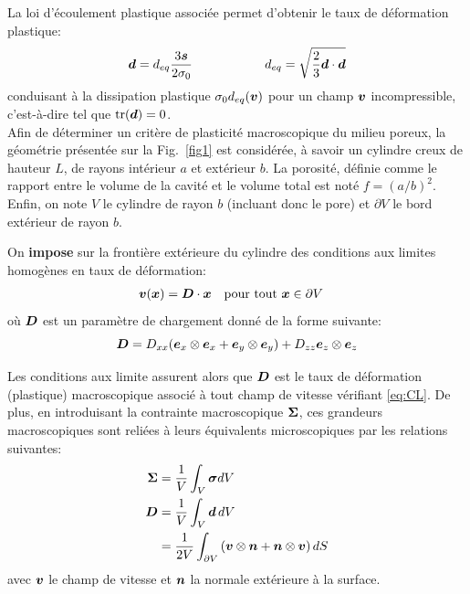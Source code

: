 \documentclass[french,12pt]{exam}
\begin{document}
La loi d'écoulement plastique associée permet d'obtenir le taux de déformation plastique:
\begin{equation}
  \boldsymbol{d} = d_{eq} \frac{3 \boldsymbol{s}}{2 \sigma_0}  \hspace{2cm} d_{eq} = \sqrt{\frac{2}{3}\boldsymbol{d} \cdot \boldsymbol{d} }
  \label{eq200}
\end{equation}
conduisant à la dissipation plastique $\sigma_0d_{eq}(\boldsymbol{v})$ pour un champ $\boldsymbol{v}$ incompressible, c'est-à-dire tel que $\mathrm{tr}(\boldsymbol{d})=0$.\\

Afin de déterminer un critère de plasticité macroscopique du milieu poreux, la géométrie présentée sur la Fig.~\ref{fig1} est considérée, à savoir un cylindre creux de hauteur $L$, de rayons intérieur $a$ et extérieur $b$. La porosité, définie comme le rapport entre le volume de la cavité et le volume total est noté $f = (a/b)^2$. Enfin, on note $V$ le cylindre de rayon $b$ (incluant donc le pore) et $\partial V$ le bord extérieur de rayon $b$.

On \textbf{impose} sur la frontière extérieure du cylindre des conditions aux limites homogènes en taux de déformation:
\begin{align}
\boldsymbol{v}(\boldsymbol{x}) &= \boldsymbol{D}\cdot\boldsymbol{x} \quad \text{pour tout }\boldsymbol{x}\in \partial V \label{eq:CL}
\end{align}
où $\boldsymbol{D}$ est un paramètre de chargement donné de la forme suivante:
\begin{equation}
\boldsymbol{D} = D_{xx} (\boldsymbol{e}_x \otimes \boldsymbol{e}_x + \boldsymbol{e}_y \otimes \boldsymbol{e}_y) + D_{zz} \boldsymbol{e}_z \otimes \boldsymbol{e}_z \label{eq:D-GPS}
\end{equation}

Les conditions aux limite assurent alors que $\boldsymbol{D}$ est le taux de déformation (plastique) macroscopique associé à tout champ de vitesse vérifiant \eqref{eq:CL}. De plus, en introduisant la contrainte macroscopique $\boldsymbol{\Sigma}$, ces grandeurs macroscopiques sont reliées à leurs équivalents microscopiques par les relations suivantes:
\begin{align}
  \boldsymbol{\Sigma} &= \frac{1}{V} \int_V \boldsymbol{\sigma} dV\\
  \boldsymbol{D} &= \frac{1}{V} \int_V \boldsymbol{d} \, dV \\
  &= \frac{1}{2V} \int_{\partial V} \left(\boldsymbol{v} \otimes \boldsymbol{n} + \boldsymbol{n} \otimes \boldsymbol{v}     \right) dS \label{eq:D-v-n}
\end{align}
avec $\boldsymbol{v}$ le champ de vitesse et $\boldsymbol{n}$ la normale extérieure à la surface.\\
\end{document}
